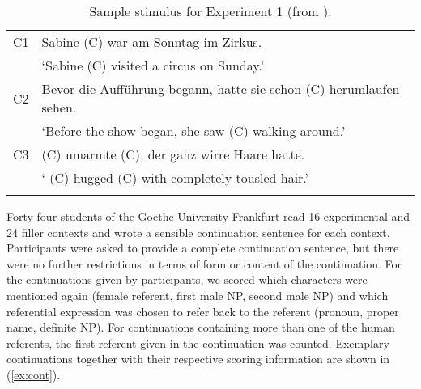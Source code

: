 \documentclass[output=paper,colorlinks,citecolor=brown]{langscibook}
\begin{document}
\begin{table}
\caption{\label{table-material-exp3}Sample stimulus for Experiment 1 (from \citealt{Bader::Portele-19-The-interpretation-of}).}
\begin{tabularx}{\textwidth}{lQ}
\lsptoprule
C1 & Sabine (C) war am Sonntag im Zirkus.\\
   & `Sabine (C) visited a circus on Sunday.'\\
C2 & Bevor die Aufführung begann, hatte sie schon  (C) herumlaufen sehen.\\
   & `Before the show began, she saw  (C) walking around.'\\
C3 &  (C) umarmte  (C), der ganz wirre Haare hatte.\\
   & ` (C) hugged  (C) with completely tousled hair.'\\
\lspbottomrule
\end{tabularx}
\end{table}

Forty-four students of the Goethe University Frankfurt read 16 experimental and 24 filler contexts and wrote a sensible continuation sentence for each context. Participants were asked to provide a complete continuation sentence, but there were no further restrictions in terms of form or content of the continuation.
For the continuations given by participants, we scored which characters were mentioned again (female referent, first male NP, second male NP) and which referential expression was chosen to refer back to the referent (pronoun, proper name, definite NP). For continuations containing more than one of the human referents, the first referent given in the continuation was counted. Exemplary continuations together with their respective scoring information are shown in (\ref{ex:cont}).
\end{document}
